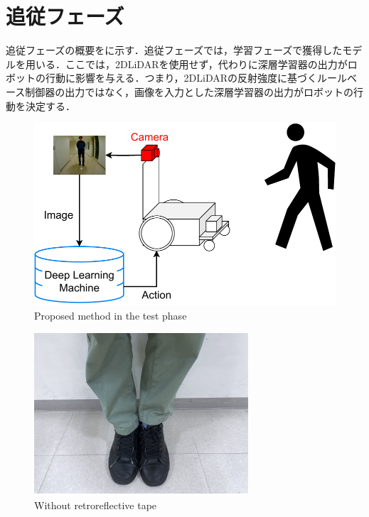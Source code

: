 
\section{追従フェーズ}

  追従フェーズの概要をに示す．追従フェーズでは，学習フェーズで獲得したモデルを用いる．ここでは，2DLiDARを使用せず，代わりに深層学習器の出力がロボットの行動に影響を与える．つまり，2DLiDARの反射強度に基づくルールベース制御器の出力ではなく，画像を入力とした深層学習器の出力がロボットの行動を決定する．

  \vspace{0.5cm}

  \begin{figure}[h]
    \centering
    \includegraphics[keepaspectratio, scale=0.45] {images/pdf/RobotGuidance_test_system}
    \captionsetup{justification=raggedright} %
    \caption{Proposed method in the test phase}
    \label{Fig:RobotGuidance_following_system}
  \end{figure}

  \vspace{0.5cm}

  \begin{figure}[h]
    \centering
    \includegraphics[keepaspectratio, scale=0.55] {images/pdf/RobotGuidance_test_phase_leg}
    \captionsetup{justification=raggedright} %
    \caption{Without retroreflective tape}
    \label{Fig:RobotGuidance_following_phase_leg}
  \end{figure}

\newpage
